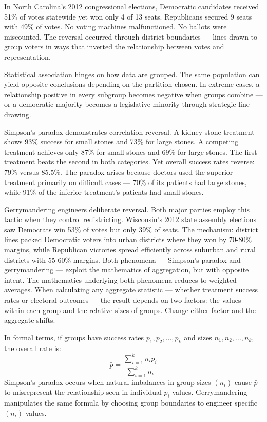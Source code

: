 In North Carolina's 2012 congressional elections, Democratic candidates received 51\% of votes statewide yet won only 4 of 13 seats. Republicans secured 9 seats with 49\% of votes. No voting machines malfunctioned. No ballots were miscounted. The reversal occurred through district boundaries — lines drawn to group voters in ways that inverted the relationship between votes and representation.

Statistical association hinges on how data are grouped. The same population can yield opposite conclusions depending on the partition chosen. In extreme cases, a relationship positive in every subgroup becomes negative when groups combine — or a democratic majority becomes a legislative minority through strategic line-drawing.

Simpson's paradox demonstrates correlation reversal. A kidney stone treatment shows 93\% success for small stones and 73\% for large stones. A competing treatment achieves only 87\% for small stones and 69\% for large stones. The first treatment beats the second in both categories. Yet overall success rates reverse: 79\% versus 85.5\%. The paradox arises because doctors used the superior treatment primarily on difficult cases — 70\% of its patients had large stones, while 91\% of the inferior treatment's patients had small stones.

Gerrymandering engineers deliberate reversal. Both major parties employ this tactic when they control redistricting. Wisconsin's 2012 state assembly elections saw Democrats win 53\% of votes but only 39\% of seats. The mechanism: district lines packed Democratic voters into urban districts where they won by 70-80\% margins, while Republican victories spread efficiently across suburban and rural districts with 55-60\% margins. Both phenomena — Simpson's paradox and gerrymandering — exploit the mathematics of aggregation, but with opposite intent. The mathematics underlying both phenomena reduces to weighted averages. When calculating any aggregate statistic — whether treatment success rates or electoral outcomes — the result depends on two factors: the values within each group and the relative sizes of groups. Change either factor and the aggregate shifts.

In formal terms, if groups have success rates $p_1, p_2, ..., p_k$ and sizes $n_1, n_2, ..., n_k$, the overall rate is:
\[
\bar{p} = \frac{\sum_{i=1}^k n_i p_i}{\sum_{i=1}^k n_i}
\]
Simpson's paradox occurs when natural imbalances in group sizes $(n_i)$ cause $\bar{p}$ to misrepresent the relationship seen in individual $p_i$ values. Gerrymandering manipulates the same formula by choosing group boundaries to engineer specific $(n_i)$ values.

